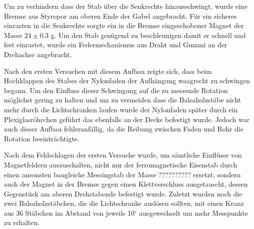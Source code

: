\documentclass[11pt]{scrartcl}
\begin{document}
Um zu verhindern dass der Stab \"uber die Senkrechte hinausschwingt, wurde eine Bremse aus Styropor am oberen Ende der Gabel angebracht. F\"ur ein sicheres einrasten in die Senkrechte sorgte ein in die Bremse eingeschobener Magnet der Masse $24 \pm 0.3$ g. Um den Stab gen\"ugend zu beschleunigen damit er schnell und fest einrastet, wurde ein Federmechanismus aus Draht und Gummi an der Drehachse angebracht. %
%

Nach den ersten Versuchen mit diesem Aufbau zeigte sich, dass beim Hochklappen des Stabes der Nylonfaden der Aufh\"angung waagrecht zu schwingen begann. Um den Einfluss dieser Schwingung auf die zu messende Rotation m\"oglichst gering zu halten und um zu vermeiden dass die Balsaholzst\"abe nicht mehr durch die Lichtschranken laufen wurde der Nylonfaden sp\"ater durch ein Plexiglasr\"ohrchen gef\"uhrt das ebenfalls an der Decke befestigt wurde. Jedoch war auch dieser Aufbau fehleranf\"allig, da die Reibung zwischen Faden und Rohr die Rotation beeintr\"achtigte.

Nach dem Fehlschlagen der ersten Versuche wurde, um s\"amtliche Einfl\"usse von Magnetfeldern auszuschalten, nicht nur der ferromagnetische Eisenstab durch einen ansonsten baugleiche Messingstab der Masse ?????????? ersetzt, sondern auch der Magnet in der Bremse gegen einen Klettverschluss ausgetauscht, dessen Gegenst\"uck am oberen Drehstabende befestigt wurde. Zuletzt wurden noch die zwei Balsaholzst\"abchen, die die Lichtschranke ausl\"osen sollten, mit einen Kranz aus 36 St\"abchen im Abstand von jeweils 10$^{\circ}$ ausgewechselt um mehr Messpunkte zu erhalten.

\end{document}
